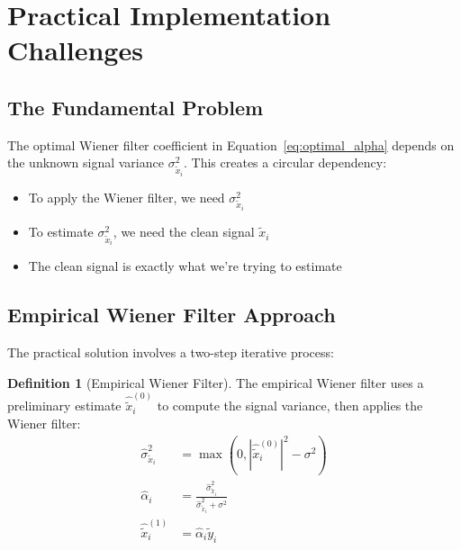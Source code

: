 \documentclass[12pt]{article}
\theoremstyle{definition}
\newtheorem{definition}[theorem]{Definition}
\begin{document}
\section{Practical Implementation Challenges}
\label{sec:practical_challenges}

\subsection{The Fundamental Problem}
\label{subsec:fundamental_problem}

The optimal Wiener filter coefficient in Equation~\ref{eq:optimal_alpha} depends on the unknown signal variance $\sigma_{\tilde{x}_i}^2$. This creates a circular dependency:

\begin{itemize}[leftmargin=*]
    \item To apply the Wiener filter, we need $\sigma_{\tilde{x}_i}^2$
    \item To estimate $\sigma_{\tilde{x}_i}^2$, we need the clean signal $\tilde{x}_i$
    \item The clean signal is exactly what we're trying to estimate
\end{itemize}

\subsection{Empirical Wiener Filter Approach}
\label{subsec:empirical_approach}

The practical solution involves a two-step iterative process:

\begin{definition}[Empirical Wiener Filter]
    \label{def:empirical_wiener}
    The empirical Wiener filter uses a preliminary estimate $\hat{\tilde{x}}_i^{(0)}$ to compute the signal variance, then applies the Wiener filter:
    \begin{align}
        \hat{\sigma}_{\tilde{x}_i}^2 & = \max(0, |\hat{\tilde{x}}_i^{(0)}|^2 - \sigma^2) \label{eq:empirical_variance}                           \\
        \hat{\alpha}_i               & = \frac{\hat{\sigma}_{\tilde{x}_i}^2}{\hat{\sigma}_{\tilde{x}_i}^2 + \sigma^2} \label{eq:empirical_alpha} \\
        \hat{\tilde{x}}_i^{(1)}      & = \hat{\alpha}_i \tilde{y}_i \label{eq:empirical_estimate}
    \end{align}
\end{definition}
\end{document}
